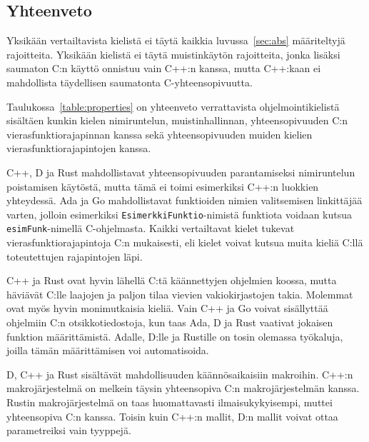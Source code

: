 \subsection{Yhteenveto}

Yksikään vertailtavista kielistä ei täytä kaikkia luvussa~\ref{sec:abs}
määriteltyjä rajoitteita. Yksikään kielistä ei täytä muistinkäytön rajoitteita,
jonka lisäksi saumaton C:n käyttö onnistuu vain C++:n kanssa, mutta C++:kaan ei
mahdollista täydellisen saumatonta C-yhteensopivuutta.

Taulukossa~\ref{table:properties} on yhteenveto verrattavista
ohjelmointikielistä sisältäen kunkin kielen nimiruntelun, muistinhallinnan,
yhteensopivuuden C:n vierasfunktiorajapinnan kanssa sekä yhteensopivuuden
muiden kielien vierasfunktiorajapintojen kanssa.

C++, D ja Rust mahdollistavat yhteensopivuuden parantamiseksi nimiruntelun
poistamisen käytöstä, mutta tämä ei toimi esimerkiksi C++:n luokkien
yhteydessä. Ada ja Go mahdollistavat funktioiden nimien valitsemisen
linkittäjää varten, jolloin esimerkiksi \texttt{EsimerkkiFunktio}-nimistä
funktiota voidaan kutsua \texttt{esimFunk}-nimellä C-ohjelmasta. Kaikki
vertailtavat kielet tukevat vierasfunktiorajapintoja C:n mukaisesti, eli kielet
voivat kutsua muita kieliä C:llä toteutettujen rajapintojen läpi.

C++ ja Rust ovat hyvin lähellä C:tä käännettyjen ohjelmien koossa, mutta
häviävät C:lle laajojen ja paljon tilaa vievien vakiokirjastojen takia.
Molemmat ovat myös hyvin monimutkaisia kieliä. Vain C++ ja Go voivat
sisällyttää ohjelmiin C:n otsikkotiedostoja, kun taas Ada, D ja Rust vaativat
jokaisen funktion määrittämistä. Adalle, D:lle ja Rustille on tosin olemassa
työkaluja, joilla tämän määrittämisen voi automatisoida.

D, C++ ja Rust sisältävät mahdollisuuden käännösaikaisiin makroihin. C++:n
makrojärjestelmä on melkein täysin yhteensopiva C:n makrojärjestelmän kanssa.
Rustin makrojärjestelmä on taas huomattavasti ilmaisukykyisempi, muttei
yhteensopiva C:n kanssa. Toisin kuin C++:n mallit, D:n mallit voivat ottaa
parametreiksi vain tyyppejä.


